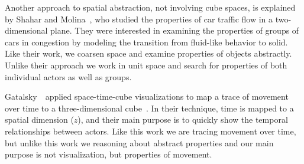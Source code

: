 Another approach to spatial abstraction, not involving cube spaces, is explained by Shahar and Molina~\cite{shahar1998knowledge}, who studied the properties of car traffic flow in a two-dimensional plane.
They were interested in examining the properties of groups of cars in congestion by modeling the transition from fluid-like behavior to solid.
Like their work, we coarsen space and examine properties of objects abstractly.
Unlike their approach we work in unit space and search for properties of both individual actors as well as groups.

Gatalsky~\etal~applied space-time-cube visualizations to map a trace of movement over time to a three-dimensional cube~\cite{gatalsky2004interactive}.
In their technique, time is mapped to a spatial dimension ($z$), and their main purpose is to quickly show the temporal relationships between actors.
Like this work we are tracing movement over time, but unlike this work we reasoning about abstract properties and our main purpose is not visualization, but properties of movement.


